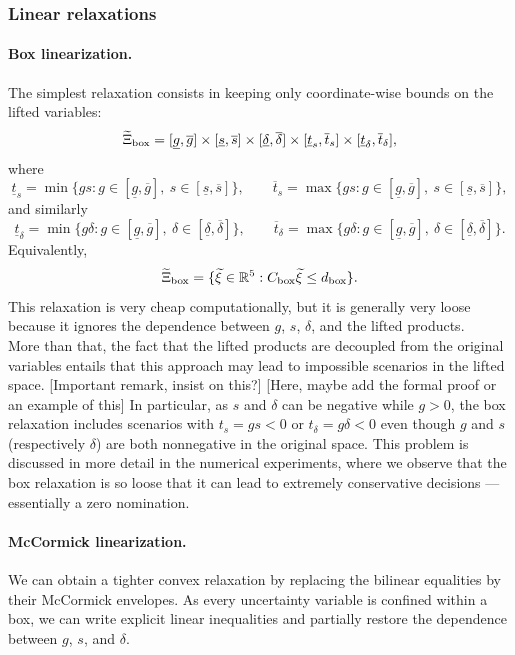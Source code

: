 \documentclass[11pt]{article}
\newcommand{\R}{\mathbb{R}}
\theoremstyle{plain}
\theoremstyle{definition}
\begin{document}
 \subsubsection{Linear relaxations}
\paragraph{Box linearization.}
 The simplest relaxation consists in keeping only coordinate-wise bounds on the lifted variables: \[ \widetilde\Xi_{\rm box} = [\underline g,\overline g] \times [\underline s,\overline s] \times [\underline\delta,\overline\delta] \times [\underline t_s,\overline t_s] \times [\underline t_\delta,\overline t_\delta], \] where \[ \underline t_s = \min\{gs:g\in[\underline g,\overline g],\ s\in[\underline s,\overline s]\}, \qquad \overline t_s = \max\{gs:g\in[\underline g,\overline g],\ s\in[\underline s,\overline s]\}, \] and similarly \[ \underline t_\delta = \min\{g\delta:g\in[\underline g,\overline g],\ \delta\in[\underline\delta,\overline\delta]\}, \qquad \overline t_\delta = \max\{g\delta:g\in[\underline g,\overline g],\ \delta\in[\underline\delta,\overline\delta]\}. \] 
 Equivalently, \[ \widetilde\Xi_{\rm box} = \{\widetilde\xi\in\R^5:C_{\rm box}\widetilde\xi\le d_{\rm box}\}. \] 
 This relaxation is very cheap computationally, but it is generally very loose because it ignores the dependence between $g$, $s$, $\delta$, and the lifted products. 
 \\

More than that, the fact that the lifted products are decoupled from the original variables entails that this approach may lead to impossible scenarios in the lifted space. \color{red}[Important remark, insist on this?] \color{black}
\color{red}[Here, maybe add the formal proof or an example of this] \color{black}
In particular, as $s$ and $\delta$ can be negative while $g>0$, the box relaxation includes scenarios with $t_s=gs<0$ or $t_\delta=g\delta<0$ even though $g$ and $s$ (respectively $\delta$) are both nonnegative in the original space. 
This problem is discussed in more detail in the numerical experiments, where we observe that the box relaxation is so loose that it can lead to extremely conservative decisions — essentially a zero nomination.

\paragraph{McCormick linearization.}
We can obtain a tighter convex relaxation by replacing the bilinear equalities by their McCormick envelopes. 
As every uncertainty variable is confined within a box, we can write explicit linear inequalities and partially restore the dependence between $g$, $s$, and $\delta$.
\\
\end{document}
